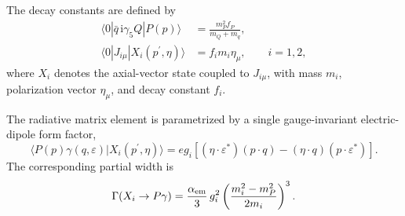 \documentclass[aps,prd,preprint,nofootinbib,superscriptaddress]{revtex4-2}
\newcommand{\ii}{\mathrm{i}}
\begin{document}
The decay constants are defined by
\begin{align}
  \langle 0|\bar q\,\ii\gamma_5 Q|P(p)\rangle
  &=
  \frac{m_P^2 f_P}{m_Q+m_q},
  \label{eq:fp-def}\\
  \langle0|J_{i\mu}|X_i(p^{\prime},\eta)\rangle
  &=f_i m_i\eta_\mu ,
  \qquad i=1,2 ,
  \label{eq:fi-def}
\end{align}
where \(X_i\) denotes the axial-vector state coupled to \(J_{i\mu}\), with
mass \(m_i\), polarization vector \(\eta_\mu\), and decay constant \(f_i\).

The radiative matrix element is parametrized by a single gauge-invariant
electric-dipole form factor,
\begin{equation}
  \langle P(p)\gamma(q,\varepsilon)|X_i(p^{\prime},\eta)\rangle
  =
  e g_i
  \left[
  (\eta\cdot\varepsilon^*)(p\cdot q)
  -(\eta\cdot q)(p\cdot\varepsilon^*)
  \right].
  \label{eq:e1}
\end{equation}
The corresponding partial width is
\begin{equation}
  \Gamma(X_i\to P\gamma)
  =
  \frac{\alpha_{\rm em}}{3}\,g_i^2
  \left(
  \frac{m_i^2-m_P^2}{2m_i}
  \right)^3 .
  \label{eq:width}
\end{equation}
\end{document}
